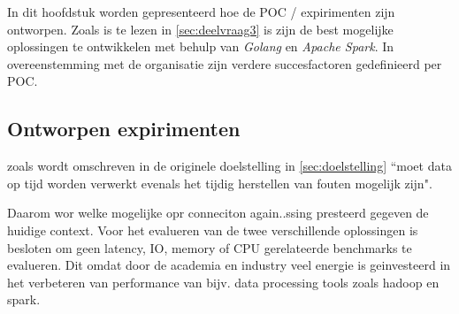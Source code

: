 


In dit hoofdstuk worden gepresenteerd hoe de POC / expirimenten zijn ontworpen. Zoals is te lezen in \ref{sec:deelvraag3} is zijn de best mogelijke oplossingen te ontwikkelen met behulp van \textit{Golang} en \textit{Apache Spark}. In overeenstemming met de organisatie zijn verdere succesfactoren gedefinieerd per POC.




\subsection{Ontworpen expirimenten}

zoals wordt omschreven in de originele doelstelling in \ref{sec:doelstelling} ``moet data op tijd worden verwerkt evenals het tijdig herstellen van fouten mogelijk zijn".

Daarom wor welke mogelijke opr conneciton again..ssing  presteerd gegeven de huidige context.
Voor het evalueren van de twee verschillende oplossingen is besloten om geen latency, IO, memory of CPU gerelateerde benchmarks te evalueren.
Dit omdat door de  academia en industry veel energie is geinvesteerd in het verbeteren van performance van bijv. data processing tools zoals hadoop en spark.


